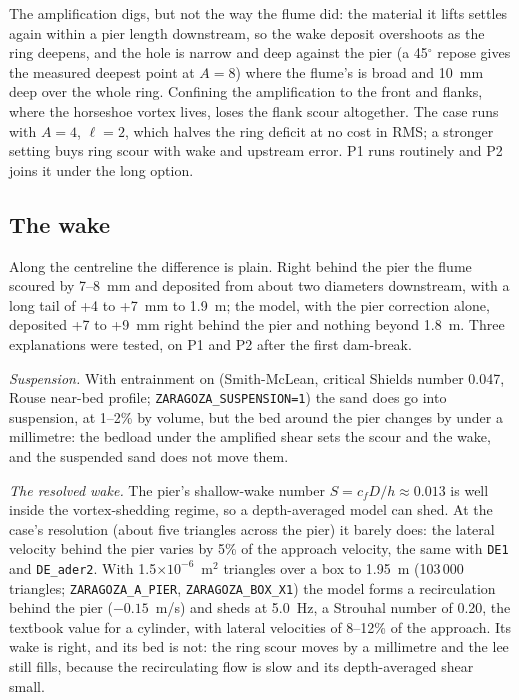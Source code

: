 The amplification digs, but not the way the flume did: the material it
lifts settles again within a pier length downstream, so the wake deposit
overshoots as the ring deepens, and the hole is narrow and deep against
the pier (a 45$^\circ$ repose gives the measured deepest point at $A = 8$)
where the flume's is broad and 10~mm deep over the whole ring. Confining
the amplification to the front and flanks, where the horseshoe vortex
lives, loses the flank scour altogether. The case runs with $A = 4$,
$\ell = 2$, which halves the ring deficit at no cost in RMS; a stronger
setting buys ring scour with wake and upstream error. P1 runs routinely and
P2 joins it under the long option.

\subsection*{The wake}

Along the centreline the difference is plain. Right behind the pier the
flume scoured by 7--8~mm and deposited from about two diameters
downstream, with a long tail of +4 to +7~mm to 1.9~m; the model, with the
pier correction alone, deposited +7 to +9~mm right behind the pier and
nothing beyond 1.8~m. Three explanations were tested, on P1 and P2 after
the first dam-break.

\emph{Suspension.} With entrainment on (Smith-McLean, critical Shields
number 0.047, Rouse near-bed profile; \texttt{ZARAGOZA\_SUSPENSION=1}) the
sand does go into suspension, at 1--2\% by volume, but the bed around the
pier changes by under a millimetre: the bedload under the amplified shear
sets the scour and the wake, and the suspended sand does not move them.

\emph{The resolved wake.} The pier's shallow-wake number
$S = c_f D / h \approx 0.013$ is well inside the vortex-shedding regime, so
a depth-averaged model can shed. At the case's resolution (about five
triangles across the pier) it barely does: the lateral velocity behind the
pier varies by 5\% of the approach velocity, the same with \texttt{DE1}
and \texttt{DE\_ader2}. With 1.5$\times10^{-6}$~m$^2$ triangles over a box
to 1.95~m (103\,000 triangles; \texttt{ZARAGOZA\_A\_PIER},
\texttt{ZARAGOZA\_BOX\_X1}) the model forms a recirculation behind the
pier ($-0.15$~m/s) and sheds at 5.0~Hz, a Strouhal number of 0.20, the
textbook value for a cylinder, with lateral velocities of 8--12\% of the
approach. Its wake is right, and its bed is not: the ring scour moves by a
millimetre and the lee still fills, because the recirculating flow is
slow and its depth-averaged shear small.


